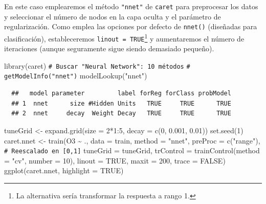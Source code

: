 \documentclass[
]{book}
\newenvironment{Shaded}{\begin{snugshade}}{\end{snugshade}}
\newcommand{\AttributeTok}[1]{\textcolor[rgb]{0.77,0.63,0.00}{#1}}
\newcommand{\CommentTok}[1]{\textcolor[rgb]{0.56,0.35,0.01}{\textit{#1}}}
\newcommand{\ConstantTok}[1]{\textcolor[rgb]{0.00,0.00,0.00}{#1}}
\newcommand{\DecValTok}[1]{\textcolor[rgb]{0.00,0.00,0.81}{#1}}
\newcommand{\FloatTok}[1]{\textcolor[rgb]{0.00,0.00,0.81}{#1}}
\newcommand{\FunctionTok}[1]{\textcolor[rgb]{0.00,0.00,0.00}{#1}}
\newcommand{\NormalTok}[1]{#1}
\newcommand{\OtherTok}[1]{\textcolor[rgb]{0.56,0.35,0.01}{#1}}
\newcommand{\SpecialCharTok}[1]{\textcolor[rgb]{0.00,0.00,0.00}{#1}}
\newcommand{\StringTok}[1]{\textcolor[rgb]{0.31,0.60,0.02}{#1}}
\theoremstyle{break}
\theoremstyle{nonumberplain}
\renewcommand{\CommentTok}[1]{\textcolor[rgb]{0.41,0.41,0.41}{\texttt{#1}}}
\begin{document}
En este caso emplearemos el método \texttt{"nnet"} de \texttt{caret} para preprocesar los datos y seleccionar el número de nodos en la capa oculta y el parámetro de regularización.
Como emplea las opciones por defecto de \texttt{nnet()} (diseñadas para clasificación),
estableceremos \texttt{linout\ =\ TRUE}\footnote{La alternativa sería transformar la respuesta a rango 1.} y aumentaremos el número de iteraciones (aunque seguramente sigue siendo demasiado pequeño).



\begin{Shaded}
\begin{Highlighting}[]
\FunctionTok{library}\NormalTok{(caret)}
\CommentTok{\# Buscar "Neural Network": 10 métodos}
\CommentTok{\# getModelInfo("nnet")}
\FunctionTok{modelLookup}\NormalTok{(}\StringTok{"nnet"}\NormalTok{)}
\end{Highlighting}
\end{Shaded}

\begin{verbatim}
  ##   model parameter         label forReg forClass probModel
  ## 1  nnet      size #Hidden Units   TRUE     TRUE      TRUE
  ## 2  nnet     decay  Weight Decay   TRUE     TRUE      TRUE
\end{verbatim}

\begin{Shaded}
\begin{Highlighting}[]
\NormalTok{tuneGrid }\OtherTok{\textless{}{-}} \FunctionTok{expand.grid}\NormalTok{(}\AttributeTok{size =} \DecValTok{2}\SpecialCharTok{*}\DecValTok{1}\SpecialCharTok{:}\DecValTok{5}\NormalTok{, }\AttributeTok{decay =} \FunctionTok{c}\NormalTok{(}\DecValTok{0}\NormalTok{, }\FloatTok{0.001}\NormalTok{, }\FloatTok{0.01}\NormalTok{))}
\FunctionTok{set.seed}\NormalTok{(}\DecValTok{1}\NormalTok{)}
\NormalTok{caret.nnet }\OtherTok{\textless{}{-}} \FunctionTok{train}\NormalTok{(O3 }\SpecialCharTok{\textasciitilde{}}\NormalTok{ ., }\AttributeTok{data =}\NormalTok{ train, }\AttributeTok{method =} \StringTok{"nnet"}\NormalTok{,}
             \AttributeTok{preProc =} \FunctionTok{c}\NormalTok{(}\StringTok{"range"}\NormalTok{), }\CommentTok{\# Reescalado en [0,1]}
             \AttributeTok{tuneGrid =}\NormalTok{ tuneGrid,}
             \AttributeTok{trControl =} \FunctionTok{trainControl}\NormalTok{(}\AttributeTok{method =} \StringTok{"cv"}\NormalTok{, }\AttributeTok{number =} \DecValTok{10}\NormalTok{), }
             \AttributeTok{linout =} \ConstantTok{TRUE}\NormalTok{, }\AttributeTok{maxit =} \DecValTok{200}\NormalTok{, }\AttributeTok{trace =} \ConstantTok{FALSE}\NormalTok{)}
\FunctionTok{ggplot}\NormalTok{(caret.nnet, }\AttributeTok{highlight =} \ConstantTok{TRUE}\NormalTok{)}
\end{Highlighting}
\end{Shaded}
\end{document}
